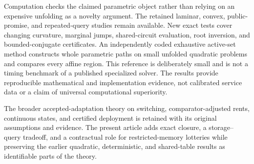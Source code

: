 Computation checks the claimed parametric object rather than relying on an expensive unfolding as a novelty argument. The retained laminar, convex, public-promise, and repeated-query studies remain available. New exact tests cover changing curvature, marginal jumps, shared-circuit evaluation, root inversion, and bounded-conjugate certificates. An independently coded exhaustive active-set method constructs whole parametric paths on small unfolded quadratic problems and compares every affine region. This reference is deliberately small and is not a timing benchmark of a published specialized solver. The results provide reproducible mathematical and implementation evidence, not calibrated service data or a claim of universal computational superiority.

The broader accepted-adaptation theory on switching, comparator-adjusted rents, continuous states, and certified deployment is retained with its original assumptions and evidence. The present article adds exact closure, a storage--query tradeoff, and a contractual role for restricted-memory lotteries while preserving the earlier quadratic, deterministic, and shared-table results as identifiable parts of the theory.

